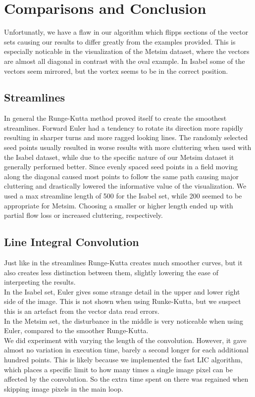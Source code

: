 \documentclass[11pt,a4paper,english]{article}
\numberwithin{equation}{section}
\begin{document}
\newpage
\section{Comparisons and Conclusion}

Unfortunatly, we have a flaw in our algorithm which flipps sections of the vector sets causing our results to differ greatly from the examples provided. This is especially noticable in the visualization of the Metsim dataset, where the vectors are almost all diagonal in contrast with the oval example. In Isabel some of the vectors seem mirrored, but the vortex seems to be in the correct position. 

\subsection{Streamlines}
In general the Runge-Kutta method proved itself to create the smoothest streamlines. Forward Euler had a tendency to rotate its direction more rapidly resulting in sharper turns and more ragged looking lines. The randomly selected seed points usually resulted in worse results with more cluttering when used with the Isabel dataset, while due to the specific nature of our Metsim dataset it generally performed better. Since evenly spaced seed points in a field moving along the diagonal caused most points to follow the same path causing major cluttering and drastically lowered the informative value of the visualization. We used a max streamline length of 500 for the Isabel set, while 200 seemed to be appropriate for Metsim. Choosing a smaller or higher length ended up with partial flow loss or increased cluttering, respectively.

\subsection{Line Integral Convolution}
Just like in the streamlines Runge-Kutta creates much smoother curves, but it also creates less distinction between them, slightly lowering the ease of interpreting the results. \\
In the Isabel set, Euler gives some strange detail in the upper and lower right side of the image. This is not shown when using Runke-Kutta, but we suspect this is an artefact from the vector data read errors.
\\
In the Metsim set, the disturbance in the middle is very noticeable when using Euler, compared to the smoother Runge-Kutta.
\\
We did experiment with varying the length of the convolution. However, it gave almost no variation in execution time, barely a second longer for each additional hundred points. This is likely because we implemented the fast LIC algorithm, which places a specific limit to how many times a single image pixel can be affected by the convolution. So the extra time spent on there was regained when skipping image pixels in the main loop.
\end{document}
